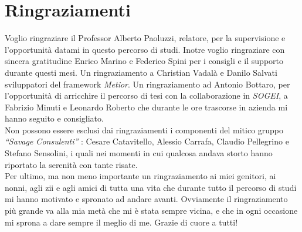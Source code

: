 \chapter{Ringraziamenti}
\label{cha:acknowledgements}

Voglio ringraziare il Professor Alberto Paoluzzi, relatore, per la supervisione e l'opportunità datami in questo percorso di studi.
Inotre voglio ringraziare con sincera gratitudine Enrico Marino e Federico Spini per i consigli e il supporto durante questi mesi.
Un ringraziamento a Christian Vadalà e Danilo Salvati sviluppatori del framework \emph{Metior}.
Un ringraziamento ad Antonio Bottaro, per l'opportunità di arricchire il percorso di tesi con la collaborazione in \emph{SOGEI},
a Fabrizio Minuti e Leonardo Roberto che durante le ore trascorse in azienda mi hanno seguito e consigliato.\\
\indent
Non possono essere esclusi dai ringraziamenti i componenti del mitico gruppo \emph{``Savage Consulenti''} :
Cesare Catavitello, Alessio Carrafa, Claudio Pellegrino e Stefano Sensolini, i quali nei momenti in cui qualcosa andava
storto hanno riportato la serenità con tante risate.\\
\indent
Per ultimo, ma non meno importante un ringraziamento ai miei genitori, ai nonni, agli zii e agli amici di tutta una vita
che durante tutto il percorso di studi mi hanno motivato e spronato ad andare avanti.
Ovviamente il ringraziamento più grande va alla mia metà che mi è stata sempre vicina, e che in ogni occasione mi sprona
a dare sempre il meglio di me. Grazie di cuore a tutti!
